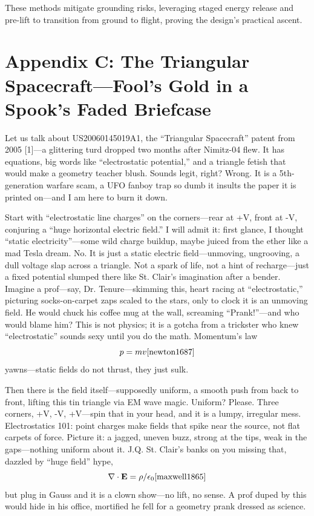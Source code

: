 \documentclass[11pt]{article}
\begin{document}
	These methods mitigate grounding risks, leveraging staged energy release and pre-lift to transition from ground to flight, proving the design’s practical ascent.
	
	\newpage
	\section*{Appendix C: The Triangular Spacecraft—Fool's Gold in a Spook's Faded Briefcase}
	Let us talk about US20060145019A1, the “Triangular Spacecraft” patent from 2005 [1]—a glittering turd dropped two months after Nimitz-04 flew. It has equations, big words like “electrostatic potential,” and a triangle fetish that would make a geometry teacher blush. Sounds legit, right? Wrong. It is a 5th-generation warfare scam, a UFO fanboy trap so dumb it insults the paper it is printed on—and I am here to burn it down.
	
	Start with “electrostatic line charges” on the corners—rear at +V, front at -V, conjuring a “huge horizontal electric field.” I will admit it: first glance, I thought “static electricity”—some wild charge buildup, maybe juiced from the ether like a mad Tesla dream. No. It is just a static electric field—unmoving, ungrooving, a dull voltage slap across a triangle. Not a spark of life, not a hint of recharge—just a fixed potential slumped there like St. Clair’s imagination after a bender. Imagine a prof—say, Dr. Tenure—skimming this, heart racing at “electrostatic,” picturing socks-on-carpet zaps scaled to the stars, only to clock it is an unmoving field. He would chuck his coffee mug at the wall, screaming “Prank!”—and who would blame him? This is not physics; it is a gotcha from a trickster who knew “electrostatic” sounds sexy until you do the math. Momentum's law
	\begin{equation}
		p = mv \cite{newton1687}
	\end{equation}
	yawns—static fields do not thrust, they just sulk.
	
	Then there is the field itself—supposedly uniform, a smooth push from back to front, lifting this tin triangle via EM wave magic. Uniform? Please. Three corners, +V, -V, +V—spin that in your head, and it is a lumpy, irregular mess. Electrostatics 101: point charges make fields that spike near the source, not flat carpets of force. Picture it: a jagged, uneven buzz, strong at the tips, weak in the gaps—nothing uniform about it. J.Q. St. Clair’s banks on you missing that, dazzled by “huge field” hype,
	\begin{equation}
		\nabla \cdot \mathbf{E} = \rho/\epsilon_0 \cite{maxwell1865}
	\end{equation}
	but plug in Gauss and it is a clown show—no lift, no sense. A prof duped by this would hide in his office, mortified he fell for a geometry prank dressed as science.
	
\end{document}
